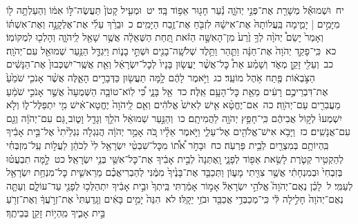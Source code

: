 \documentclass[18pt]{article}
\newcommand{\vart}[1]{\Bfootnote{#1}}	%
\begin{document}
 {\loc יח~}וּשְׁמוּאֵ֕ל מְשָׁרֵ֖ת אֶת־פְּנֵ֣י יְהֹוָ֑ה נַ֕עַר חָג֖וּר אֵפ֥וֹד בָּֽד׃ \startlock
 {\loc יט~}וּמְעִ֤יל קָטֹן֙ תַּעֲשֶׂה־לּ֣וֹ אִמּ֔וֹ וְהַעַלְתָ֥ה ל֖וֹ מִיָּמִ֣ים  |  יָמִ֑ימָה בַּֽעֲלוֹתָהּ֙ אֶת־אִישָׁ֔הּ לִזְבֹּ֖חַ אֶת־זֶ֥בַח הַיָּמִֽים׃ \startlock
 {\loc כ~}וּבֵרַ֨ךְ עֵלִ֜י אֶת־אֶלְקָנָ֣ה וְאֶת־אִשְׁתּ֗וֹ וְאָמַר֙ יָשֵׂם֩ יְהֹוָ֨ה לְךָ֥ זֶ֙רַע֙ מִן־הָאִשָּׁ֣ה הַזֹּ֔את תַּ֚חַת הַשְּׁאֵלָ֔ה אֲשֶׁ֥ר שָׁאַ֖ל לַֽיהֹוָ֑ה וְהָלְכ֖וּ לִמְקוֹמֽוֹ׃ \startlock
 {\loc כא~}כִּֽי־פָקַ֤ד יְהֹוָה֙ אֶת־חַנָּ֔ה וַתַּ֛הַר וַתֵּ֥לֶד שְׁלֹשָֽׁה־בָנִ֖ים וּשְׁתֵּ֣י בָנ֑וֹת וַיִּגְדַּ֛ל הַנַּ֥עַר שְׁמוּאֵ֖ל עִם־יְהֹוָֽה׃ \startlock
 {\loc כב~}וְעֵלִ֖י זָקֵ֣ן מְאֹ֑ד וְשָׁמַ֗ע אֵת֩ כׇּל־אֲשֶׁ֨ר יַעֲשׂ֤וּן בָּנָיו֙ לְכׇל־יִשְׂרָאֵ֔ל וְאֵ֤ת אֲשֶֽׁר־יִשְׁכְּבוּן֙ אֶת־הַנָּשִׁ֔ים הַצֹּ֣בְא֔וֹת פֶּ֖תַח אֹ֥הֶל מוֹעֵֽד׃ \startlock
 {\loc כג~}וַיֹּ֣אמֶר לָהֶ֔ם לָ֥מָּה תַעֲשׂ֖וּן כַּדְּבָרִ֣ים הָאֵ֑לֶּה אֲשֶׁ֨ר אָנֹכִ֤י שֹׁמֵ֙עַ֙ אֶת־דִּבְרֵיכֶ֣ם רָעִ֔ים מֵאֵ֖ת כׇּל־הָעָ֥ם אֵֽלֶּה׃ \startlock
 {\loc כד~}אַ֖ל בָּנָ֑י כִּ֠י לֽוֹא־טוֹבָ֤ה הַשְּׁמֻעָה֙ אֲשֶׁ֣ר אָנֹכִ֣י שֹׁמֵ֔עַ מַעֲבִרִ֖ים עַם־יְהֹוָֽה׃ \startlock
 {\loc כה~}אִם־יֶחֱטָ֨א אִ֤ישׁ לְאִישׁ֙  \edtext{וּפִֽלְל֣וֹ}{\vart{א=וּפִֽלֲל֣וֹ | }}  אֱלֹהִ֔ים וְאִ֤ם לַֽיהֹוָה֙ יֶחֱטָא־אִ֔ישׁ מִ֖י יִתְפַּלֶּל־ל֑וֹ וְלֹ֤א יִשְׁמְעוּ֙ לְק֣וֹל אֲבִיהֶ֔ם כִּֽי־חָפֵ֥ץ יְהֹוָ֖ה לַהֲמִיתָֽם׃ \startlock
 {\loc כו~}וְהַנַּ֣עַר שְׁמוּאֵ֔ל הֹלֵ֥ךְ וְגָדֵ֖ל וָט֑וֹב גַּ֚ם עִם־יְהֹוָ֔ה וְגַ֖ם עִם־אֲנָשִֽׁים׃ \startlock
 {\loc כז~}וַיָּבֹ֥א אִישׁ־אֱלֹהִ֖ים אֶל־עֵלִ֑י וַיֹּ֣אמֶר אֵלָ֗יו כֹּ֚ה אָמַ֣ר יְהֹוָ֔ה הֲנִגְלֹ֤ה נִגְלֵ֙יתִי֙ אֶל־בֵּ֣ית אָבִ֔יךָ בִּֽהְיוֹתָ֥ם בְּמִצְרַ֖יִם לְבֵ֥ית פַּרְעֹֽה׃ \startlock
 {\loc כח~}וּבָחֹ֣ר אֹ֠ת֠וֹ מִכׇּל־שִׁבְטֵ֨י יִשְׂרָאֵ֥ל לִי֙ לְכֹהֵ֔ן לַעֲל֣וֹת עַֽל־מִזְבְּחִ֗י לְהַקְטִ֥יר קְטֹ֛רֶת לָשֵׂ֥את אֵפ֖וֹד לְפָנָ֑י וָֽאֶתְּנָה֙ לְבֵ֣ית אָבִ֔יךָ אֶת־כׇּל־אִשֵּׁ֖י בְּנֵ֥י יִשְׂרָאֵֽל׃ \startlock
 {\loc כט~}לָ֣מָּה תִבְעֲט֗וּ בְּזִבְחִי֙ וּבְמִנְחָתִ֔י אֲשֶׁ֥ר צִוִּ֖יתִי מָע֑וֹן וַתְּכַבֵּ֤ד אֶת־בָּנֶ֙יךָ֙ מִמֶּ֔נִּי לְהַבְרִיאֲכֶ֗ם מֵרֵאשִׁ֛ית כׇּל־מִנְחַ֥ת יִשְׂרָאֵ֖ל לְעַמִּֽי׃ \startlock
 {\loc ל~}לָכֵ֗ן נְאֻם־יְהֹוָה֮ אֱלֹהֵ֣י יִשְׂרָאֵל֒ אָמ֣וֹר אָמַ֔רְתִּי בֵּֽיתְךָ֙ וּבֵ֣ית אָבִ֔יךָ יִתְהַלְּכ֥וּ לְפָנַ֖י עַד־עוֹלָ֑ם וְעַתָּ֤ה נְאֻם־יְהֹוָה֙ חָלִ֣ילָה לִּ֔י כִּֽי־מְכַבְּדַ֥י אֲכַבֵּ֖ד וּבֹזַ֥י יֵקָֽלּוּ׃ \startlock
 {\loc לא~}הִנֵּה֙ יָמִ֣ים בָּאִ֔ים וְגָֽדַעְתִּי֙ אֶת־זְרֹ֣עֲךָ֔ וְאֶת־זְרֹ֖עַ בֵּ֣ית אָבִ֑יךָ מִֽהְי֥וֹת זָקֵ֖ן בְּבֵיתֶֽךָ׃ \startlock
\end{document}
